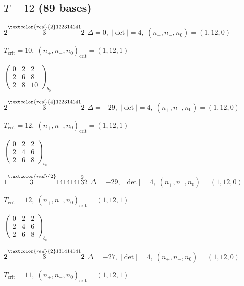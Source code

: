 \documentclass[10pt]{article}
\begin{document}
\subsection*{$T = 12$ \quad (89 bases)}
\smallskip

$2\overset{\textcolor{red}{2}122314141}{3}2$ \quad $\Delta=0,\; |\det|=4,\; (n_+,n_-,n_0)=(1,12,0)$

\hspace{1em}$T_{\text{crit}}=10,\; (n_+,n_-,n_0)_{\text{crit}}=(1,12,1)$

\hspace{2em}$\left(\begin{smallmatrix}0 & 2 & 2 \\ 2 & 6 & 8 \\ 2 & 8 & 10\end{smallmatrix}\right)_{\!b_0}$

$2\overset{\textcolor{red}{4}122314141}{3}2$ \quad $\Delta=-29,\; |\det|=4,\; (n_+,n_-,n_0)=(1,12,0)$

\hspace{1em}$T_{\text{crit}}=12,\; (n_+,n_-,n_0)_{\text{crit}}=(1,12,1)$

\hspace{2em}$\left(\begin{smallmatrix}0 & 2 & 2 \\ 2 & 4 & 6 \\ 2 & 6 & 8\end{smallmatrix}\right)_{\!b_0}$

\smallskip

$1\overset{\textcolor{red}{2}}{3}1414141\overset{2}{3}2$ \quad $\Delta=-29,\; |\det|=4,\; (n_+,n_-,n_0)=(1,12,0)$

\hspace{1em}$T_{\text{crit}}=12,\; (n_+,n_-,n_0)_{\text{crit}}=(1,12,1)$

\hspace{2em}$\left(\begin{smallmatrix}0 & 2 & 2 \\ 2 & 4 & 6 \\ 2 & 6 & 8\end{smallmatrix}\right)_{\!b_0}$

$2\overset{\textcolor{red}{2}131414141}{3}2$ \quad $\Delta=-27,\; |\det|=4,\; (n_+,n_-,n_0)=(1,12,0)$

\hspace{1em}$T_{\text{crit}}=11,\; (n_+,n_-,n_0)_{\text{crit}}=(1,12,1)$
\end{document}
